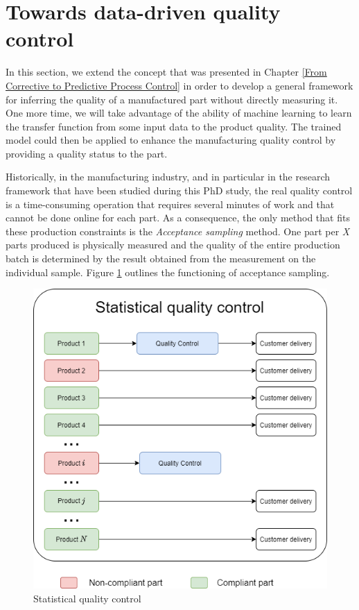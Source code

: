 \section{Towards data-driven quality control}

In this section, we extend the concept that was presented in Chapter \ref{From Corrective to Predictive Process Control} in order to develop a general framework for inferring the quality of a manufactured part without directly measuring it. One more time, we will take advantage of the ability of machine learning to learn the transfer function from some input data to the product quality. The trained model could then be applied to enhance the manufacturing quality control by providing a quality status to the part.

Historically, in the manufacturing industry, and in particular in the research framework that have been studied during this PhD study, the real quality control is a time-consuming operation that requires several minutes of work and that cannot be done online for each part. As a consequence, the only method that fits these production constraints is the \textit{Acceptance sampling} method. One part per \textit{X} parts produced is physically measured and the quality of the entire production batch is determined by the result obtained from the measurement on the individual sample. Figure \ref{fig:statistical_quality_control} outlines the functioning of acceptance sampling. 

\begin{figure}
\centering
\includegraphics[scale=0.50]{images/chapter_4/statistical_quality_control.png}
\caption{Statistical quality control}
\label{fig:statistical_quality_control}
\end{figure}

